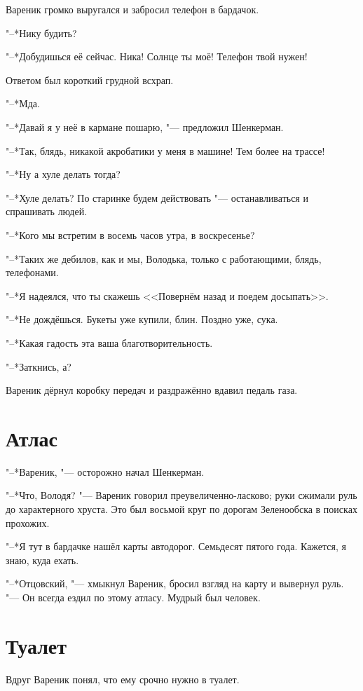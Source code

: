 Вареник громко выругался и забросил телефон в бардачок.

"--*Нику будить?

"--*Добудишься её сейчас.
Ника!
Солнце ты моё!
Телефон твой нужен!

Ответом был короткий грудной всхрап.

"--*Мда.

"--*Давай я у неё в кармане пошарю, "--- предложил Шенкерман.

"--*Так, блядь, никакой акробатики у меня в машине!
Тем более на трассе!

"--*Ну а хуле делать тогда?

"--*Хуле делать?
По старинке будем действовать "--- останавливаться и спрашивать людей.

"--*Кого мы встретим в восемь часов утра, в воскресенье?

"--*Таких же дебилов, как и мы, Володька, только с работающими, блядь, телефонами.

"--*Я надеялся, что ты скажешь <<Повернём назад и поедем досыпать>>.

"--*Не дождёшься.
Букеты уже купили, блин.
Поздно уже, сука.

"--*Какая гадость эта ваша благотворительность.

"--*Заткнись, а?

Вареник дёрнул коробку передач и раздражённо вдавил педаль газа.

\section{Атлас}

"--*Вареник, "--- осторожно начал Шенкерман.

"--*Что, Володя? "--- Вареник говорил преувеличенно-ласково;
руки сжимали руль до характерного хруста.
Это был восьмой круг по дорогам Зеленообска в поисках прохожих.

"--*Я тут в бардачке нашёл карты автодорог.
Семьдесят пятого года.
Кажется, я знаю, куда ехать.

"--*Отцовский, "--- хмыкнул Вареник, бросил взгляд на карту и вывернул руль.
"--- Он всегда ездил по этому атласу.
Мудрый был человек.

\section{Туалет}

Вдруг Вареник понял, что ему срочно нужно в туалет.


